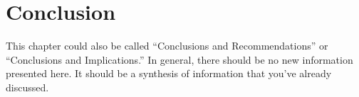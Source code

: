 \chapter{Conclusion} \label{chapterConclusion}


This chapter could also be called “Conclusions and Recommendations” or “Conclusions and Implications.” In general, there should be no new information presented here.  It should be a synthesis of information that you’ve already discussed. 
